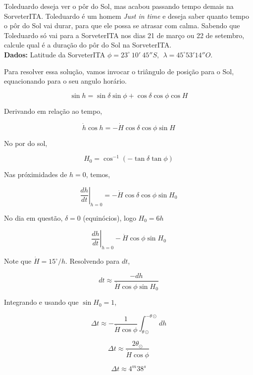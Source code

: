 \documentclass[11pt]{article}
\begin{document}
\begin{pproblem}
    Toleduardo deseja ver o pôr do Sol, mas acabou passando tempo demais na SorveterITA. Toleduardo é um homem \textit{Just in time} e deseja saber quanto tempo o pôr do Sol vai durar, para que ele possa se atrasar com calma. Sabendo que Toleduardo só vai para a SorveterITA nos dias 21 de março ou 22 de setembro, calcule qual é a duração do pôr do Sol na SorveterITA.
    \\
    \textbf{Dados: } Latitude da SorveterITA \(\phi = 23^\circ \ 10' \ 45''S, \ \ \lambda = 45^\circ 53' 14''O\).
\end{pproblem}
\begin{pssolution*}{}{}
    
    Para resolver essa solução, vamos invocar o triângulo de posição para o Sol, equacionando para o seu angulo horário.

    \[\sin h = \sin\delta\sin\phi + \cos\delta\cos\phi\cos H\] 

    Derivando em relação ao tempo, 

    \[\dot h \cos h = -\dot H \cos\delta\cos\phi \sin H\]

    No por do sol, 

    \[H_0 = \cos^{-1}\left(-\tan\delta\tan\phi\right)\]

    Nas próximidades de \(h=0\), temos, 

    \[\left. \frac{dh}{dt}\right|_{h=0} = -\dot H \cos\delta\cos\phi\sin H_0\]

    No dia em questão, \(\delta = 0\) (equinócios), logo \(H_0 = 6h\)

    \[\left. \frac{dh}{dt}\right|_{h=0} - \dot{H}\cos\phi\sin H_0\]

    Note que \(\dot H = 15^{\circ}/h\). Resolvendo para \(dt\), 
    
    \[dt \approx \frac{-dh}{\dot{H}\cos\phi \sin H_0}\]

    Integrando e usando que \(\sin H_0 = 1 \), 

    \[\Delta t \approx -\frac{1}{\dot H \cos \phi}\int_{\theta\odot}^{-\theta\odot}dh\]

    \[\Delta t \approx \frac{2\theta_\odot}{\dot H \cos \phi}\]

    \[\boxed{\Delta t \approx 4^m38^s}\]
\end{pssolution*}
\end{document}
